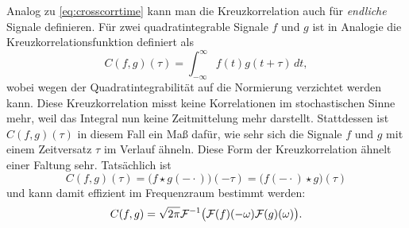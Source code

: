 Analog zu \eqref{eq:crosscorrtime} kann man die Kreuzkorrelation auch
für \emph{endliche} Signale definieren. Für zwei quadratintegrable
Signale $f$ und $g$ ist in Analogie die Kreuzkorrelationsfunktion
definiert als
\begin{equation}
  C(f,g)(\tau) = \int_{-\infty}^{\infty} f(t)g(t+\tau)\,dt,
\end{equation}
wobei wegen der Quadratintegrabilität auf die Normierung verzichtet
werden kann. Diese Kreuzkorrelation misst keine Korrelationen im
stochastischen Sinne mehr, weil das Integral nun keine Zeitmittelung
mehr darstellt. Stattdessen ist $C(f,g)(\tau)$ in diesem Fall ein Maß
dafür, wie sehr sich die Signale $f$ und $g$ mit einem Zeitversatz
$\tau$ im Verlauf ähneln. Diese Form der Kreuzkorrelation ähnelt einer
Faltung sehr. Tatsächlich ist
\begin{equation}
  C(f,g)(\tau) = \bigl(f \star g(-\cdot)\bigr)(-\tau) =
  \bigl(f(-\cdot) \star g\bigr)(\tau)
\end{equation}
und kann damit effizient im Frequenzraum bestimmt werden:
\begin{equation}
  \label{eq:crosscorrfft}
  C(f,g) = \sqrt{2\pi}\mathcal F^{-1}
  \bigl(\mathcal F(f)(-\omega)\mathcal F(g)(\omega)\bigr).
\end{equation}

